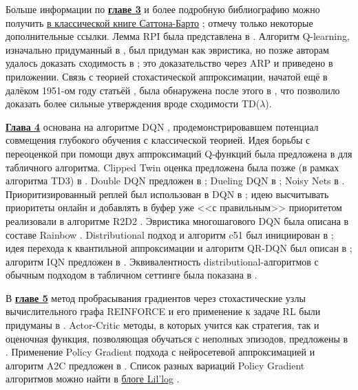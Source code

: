 Больше информации по \underline{\textbf{главе 3}} и более подробную библиографию можно получить \href{https://drive.google.com/file/d/1Z4W_-0IaMNpZnhnMkqcDVM_EA79GFJo-/view}{в классической книге Саттона-Барто} \cite{sutton2018reinforcement}; отмечу только некоторые дополнительные ссылки. Лемма RPI была представлена в \cite{kakade2002approximately}. Алгоритм Q-learning, изначально придуманный в \cite{watkins1989learning}, был придуман как эвристика, но позже авторам удалось доказать сходимость в \cite{watkins1992q}; это доказательство через ARP и приведено в приложении. Связь с теорией стохастической аппроксимации, начатой ещё в далёком 1951-ом году статьёй \cite{robbins1951stochastic}, была обнаружена после этого в \cite{tsitsiklis1994asynchronous}, что позволило доказать более сильные утверждения вроде сходимости TD($\lambda$).

\underline{\textbf{Глава 4}} основана на алгоритме DQN \cite{mnih2013playing}, продемонстрировавшем потенциал совмещения глубокого обучения с классической теорией. Идея борьбы с переоценкой при помощи двух аппроксимаций Q-функций была предложена в \cite{hasselt2010double} для табличного алгоритма. Clipped Twin оценка предложена была позже (в рамках алгоритма TD3) в \cite{fujimoto2018addressing}. Double DQN предложен в \cite{van2016deep}; Dueling DQN в \cite{wang2015dueling}; Noisy Nets в \cite{fortunato2017noisy}. Приоритизированный реплей был использован в DQN в \cite{schaul2015prioritized}; идею высчитывать приоритеты онлайн и добавлять в буфер уже <<с правильным>> приоритетом реализовали в алгоритме R2D2 \cite{horgan2018distributed}. Эвристика многошагового DQN была описана в составе Rainbow \cite{hessel2018rainbow}. Distributional подход и алгоритм c51 был инициирован в \cite{bellemare2017distributional}; идея перехода к квантильной аппроксимации и алгоритм QR-DQN был описан в \cite{dabney2018distributional}; алгоритм IQN предложен в \cite{dabney2018implicit}. Эквивалентность distributional-алгоритмов с обычным подходом в табличном сеттинге была показана в \cite{lyle2019comparative}.

В \underline{\textbf{главе 5}} метод пробрасывания градиентов через стохастические узлы вычислительного графа REINFORCE и его применение к задаче RL были придуманы в \cite{williams1992simple}. Actor-Critic методы, в которых учится как стратегия, так и оценочная функция, позволяющая обучаться с неполных эпизодов, предложены в \cite{sutton2000policy}. Применение Policy Gradient подхода с нейросетевой аппроксимацией и алгоритм A2C предложен в \cite{mnih2016asynchronous}. Список разных вариаций Policy Gradient алгоритмов можно найти в \href{https://lilianweng.github.io/lil-log/2018/04/08/policy-gradient-algorithms.html}{блоге Lil'log} \cite{weng2018PG}.

